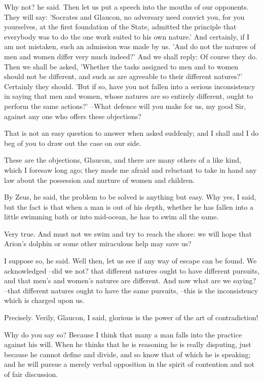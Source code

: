 Why not? he said.
Then let us put a speech into the mouths of our opponents. They will say: 'Socrates and Glaucon, no adversary need convict you, for you yourselves, at the first foundation of the State, admitted the principle that everybody was to do the one work suited to his own nature.' And certainly, if I am not mistaken, such an admission was made by us. 'And do not the natures of men and women differ very much indeed?' And we shall reply: Of course they do. Then we shall be asked, 'Whether the tasks assigned to men and to women should not be different, and such as are agreeable to their different natures?' Certainly they should. 'But if so, have you not fallen into a serious inconsistency in saying that men and women, whose natures are so entirely different, ought to perform the same actions?' --What defence will you make for us, my good Sir, against any one who offers these objections?

That is not an easy question to answer when asked suddenly; and I shall and I do beg of you to draw out the case on our side.

These are the objections, Glaucon, and there are many others of a like kind, which I foresaw long ago; they made me afraid and reluctant to take in hand any law about the possession and nurture of women and children.

By Zeus, he said, the problem to be solved is anything but easy.
Why yes, I said, but the fact is that when a man is out of his depth, whether he has fallen into a little swimming bath or into mid-ocean, he has to swim all the same.

Very true.
And must not we swim and try to reach the shore: we will hope that Arion's dolphin or some other miraculous help may save us?

I suppose so, he said.
Well then, let us see if any way of escape can be found. We acknowledged --did we not? that different natures ought to have different pursuits, and that men's and women's natures are different. And now what are we saying? --that different natures ought to have the same pursuits, --this is the inconsistency which is charged upon us.

Precisely.
Verily, Glaucon, I said, glorious is the power of the art of contradiction!

Why do you say so?
Because I think that many a man falls into the practice against his will. When he thinks that he is reasoning he is really disputing, just because he cannot define and divide, and so know that of which he is speaking; and he will pursue a merely verbal opposition in the spirit of contention and not of fair discussion.


